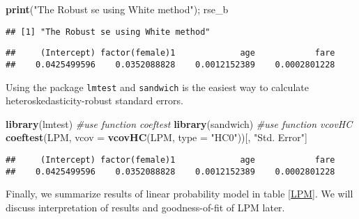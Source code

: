 \documentclass[
  12pt,
]{article}
\newenvironment{Shaded}{\begin{snugshade}}{\end{snugshade}}
\newcommand{\CommentTok}[1]{\textcolor[rgb]{0.56,0.35,0.01}{\textit{#1}}}
\newcommand{\DataTypeTok}[1]{\textcolor[rgb]{0.13,0.29,0.53}{#1}}
\newcommand{\KeywordTok}[1]{\textcolor[rgb]{0.13,0.29,0.53}{\textbf{#1}}}
\newcommand{\NormalTok}[1]{#1}
\newcommand{\StringTok}[1]{\textcolor[rgb]{0.31,0.60,0.02}{#1}}
\begin{document}
\begin{Shaded}
\begin{Highlighting}[]
\KeywordTok{print}\NormalTok{(}\StringTok{"The Robust se using White method"}\NormalTok{); rse\_b}
\end{Highlighting}
\end{Shaded}

\begin{verbatim}
## [1] "The Robust se using White method"
\end{verbatim}

\begin{verbatim}
##     (Intercept) factor(female)1             age            fare 
##    0.0425499596    0.0352088828    0.0012152389    0.0002801228
\end{verbatim}

Using the package \texttt{lmtest} and \texttt{sandwich} is the easiest
way to calculate heteroskedasticity-robust standard errors.

\begin{Shaded}
\begin{Highlighting}[]
\KeywordTok{library}\NormalTok{(lmtest) }\CommentTok{\#use function \textasciigrave{}coeftest\textasciigrave{}}
\KeywordTok{library}\NormalTok{(sandwich) }\CommentTok{\#use function \textasciigrave{}vcovHC\textasciigrave{}}
\KeywordTok{coeftest}\NormalTok{(LPM, }\DataTypeTok{vcov =} \KeywordTok{vcovHC}\NormalTok{(LPM, }\DataTypeTok{type =} \StringTok{"HC0"}\NormalTok{))[, }\StringTok{"Std. Error"}\NormalTok{]}
\end{Highlighting}
\end{Shaded}

\begin{verbatim}
##     (Intercept) factor(female)1             age            fare 
##    0.0425499596    0.0352088828    0.0012152389    0.0002801228
\end{verbatim}

Finally, we summarize results of linear probability model in table
\ref{LPM}. We will discuss interpretation of results and goodness-of-fit
of LPM later.
\end{document}
